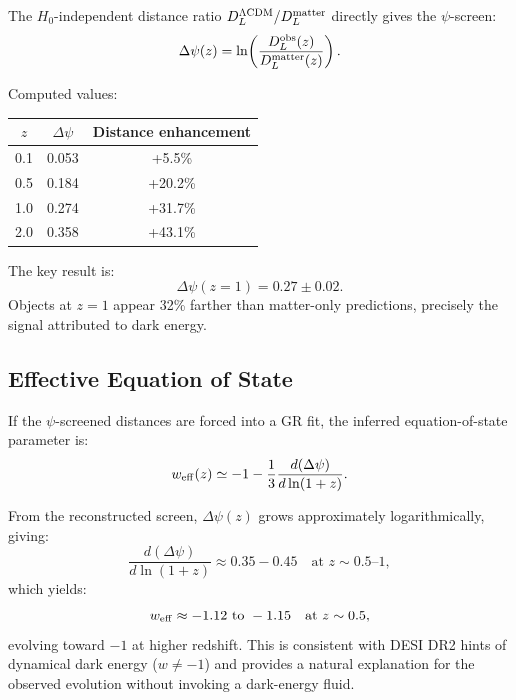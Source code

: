 \documentclass[aps,prd,twocolumn,superscriptaddress,nofootinbib]{revtex4-2}
\begin{document}
The $H_0$-independent distance ratio
$D_L^{\Lambda\rm CDM}/D_L^{\rm matter}$ directly gives the
$\psi$-screen:
\begin{equation}\label{eq:screen-reconstruction}
\Delta\psi(z) = \ln\!\left(\frac{D_L^{\rm obs}(z)}{D_L^{\rm matter}(z)}\right).
\end{equation}

Computed values:
\begin{center}
\begin{tabular}{ccc}
\toprule
$z$ & $\Delta\psi$ & Distance enhancement \\
\midrule
0.1 & 0.053 & +5.5\% \\
0.5 & 0.184 & +20.2\% \\
1.0 & 0.274 & +31.7\% \\
2.0 & 0.358 & +43.1\% \\
\bottomrule
\end{tabular}
\end{center}

The key result is:
\begin{equation}\label{eq:psi-z1}
\boxed{\Delta\psi(z=1) = 0.27 \pm 0.02.}
\end{equation}
Objects at $z = 1$ appear 32\% farther than matter-only predictions,
precisely the signal attributed to dark energy.

\subsection{Effective Equation of State}\label{sec:w-eff}

If the $\psi$-screened distances are forced into a GR fit, the
inferred equation-of-state parameter is:
\begin{equation}\label{eq:weff}
w_{\rm eff}(z) \simeq -1 - \frac{1}{3}\frac{d(\Delta\psi)}{d\ln(1+z)}.
\end{equation}

From the reconstructed screen, $\Delta\psi(z)$ grows approximately
logarithmically, giving:
\begin{equation}
\frac{d(\Delta\psi)}{d\ln(1+z)} \approx 0.35 - 0.45
\quad\text{at } z \sim 0.5\text{--}1,
\end{equation}
which yields:
\begin{equation}\label{eq:w-prediction}
w_{\rm eff} \approx -1.12~\text{to}~-1.15
\quad\text{at } z \sim 0.5,
\end{equation}
evolving toward $-1$ at higher redshift. This is consistent with
DESI DR2 hints of dynamical dark energy ($w \neq -1$) and provides
a natural explanation for the observed evolution without invoking
a dark-energy fluid.
\end{document}
